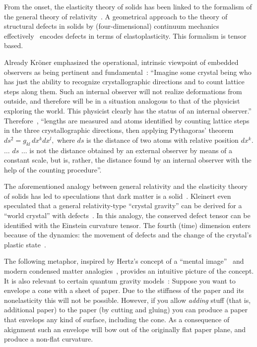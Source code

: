 \documentclass[%
  reprint,
  superscriptaddress,
  showpacs,
  showkeys,
  amsmath,amssymb,
  pra,
  longbibliography,
  floatfix,
  x11names
]{revtex4-2}
\begin{document}
From the onset, the elasticity theory of solids has been linked to the formalism of the general theory of relativity~\cite{schaefer-1953,zaanen-2022}.
A geometrical approach to the theory of structural defects in solids by (four-dimensional)
continuum mechanics~\cite{Kroner-1958,kroner-1959,Kosevich-1962,Turski-66,kroner-1967,kroner-1975,Kossecka_deWit-77,kroner-1985,kroner-1990,kroner-2001,amari-1968,gunther-1972,Guenther-1979,gunther-1981,gunther-1983,golebiewska-lasota-1979a,golebiewska-lasota-1979b}
effectively~\cite{anderson:73} encodes defects in terms of  elastoplasticity.
This formalism is tensor based.

Already Kr\"oner emphasized the
operational, intrinsic viewpoint of embedded observers as being pertinent and fundamental~\cite{kroner-1990}:
``Imagine some crystal being who has just the ability to recognize
crystallographic directions and to count lattice steps along them. Such an
internal observer will not realize deformations from outside, and therefore
will be in a situation analogous to that of the physicist exploring the world.
This physicist clearly has the status of an internal observer.''
Therefore~\cite{kroner-1985}, ``lengths are measured and atoms identified by
counting lattice steps in the three crystallographic directions, then applying Pythagoras' theorem
$
ds^2 = g_{kl}\, dx^k dx^l,
$
where $ds$ is the distance of two atoms with relative position $dx^k$.
$\ldots$
$ds$ $\ldots$ is not the distance obtained by
an external observer by means of a constant scale, but is, rather, the distance found
by an internal observer with the help of the counting procedure''.

The aforementioned analogy between general relativity and the elasticity theory of solids
has led to speculations that dark matter is a solid~\cite{Bucher-PhysRevD.60.043505}.
Kleinert even speculated that a general relativity-type ``crystal gravity'' can be derived for a ``world crystal'' with defects~\cite{kleinert-1987,kleinert-2000,kroner-2001,kleinert-2004}.
In this analogy, the conserved defect tensor can be identified with the Einstein curvature tensor.
The fourth (time) dimension enters because of the dynamics: the movement of defects and the change of the crystal's plastic state~\cite{amari-1968}.

The following metaphor, inspired by Hertz's concept of a ``mental image''~\cite{hertz-94e} and modern condensed matter analogies~\cite{zaanen-2022},
provides an intuitive picture of the concept. It is also relevant to certain quantum gravity models~\cite{Ambjorn2012_review, barkley-2019}:
Suppose you want to envelope a cone with a sheet of paper.
Due to the stiffness of the paper and its nonelasticity this will not be possible.
However, if you allow \emph{adding} stuff (that is, additional paper) to the paper (by cutting and gluing) you can
produce a paper that envelops any kind of surface, including the cone. As a consequence of akignment such an envelope will bow out of the originally flat
paper plane, and produce a non-flat curvature.
\end{document}
